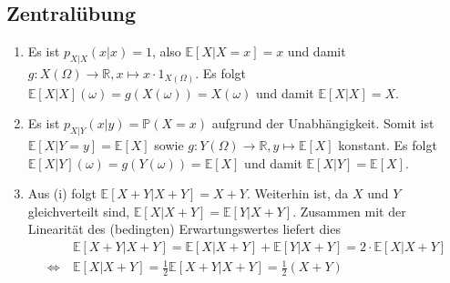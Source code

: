 \documentclass[a4paper]{article}
\begin{document}
\makeexheader

\subsection{Zentralübung}

\begin{enumerate}
    \item Es ist $p_{X|X}(x|x) = 1$, also $\mathds{E}[X|X=x] = x$ und damit $g: X(\Omega) \to \mathds{R}, x \mapsto x \cdot 1_{X(\Omega)}$. Es folgt $\mathds{E}[X|X](\omega) = g(X(\omega)) = X(\omega)$ und damit $\mathds{E}[X|X] = X$.
    \item Es ist $p_{X|Y}(x|y) = \mathds{P}(X = x)$ aufgrund der Unabhängigkeit. Somit ist $\mathds{E}[X|Y=y] = \mathds{E}[X]$ sowie $g: Y(\Omega) \to \mathds{R}, y \mapsto \mathds{E}[X]$ konstant. Es folgt $\mathds{E}[X|Y](\omega) = g(Y(\omega)) = \mathds{E}[X]$ und damit $\mathds{E}[X|Y] = \mathds{E}[X]$.
    \item Aus (i) folgt $\mathds{E}[X + Y | X + Y] = X + Y$. Weiterhin ist, da $X$ und $Y$ gleichverteilt sind, $\mathds{E}[X | X + Y] = \mathds{E}[Y | X + Y]$. Zusammen mit der Linearität des (bedingten) Erwartungswertes liefert dies
    \begin{align*}
        &\mathds{E}[X + Y | X + Y] = \mathds{E}[X| X + Y] + \mathds{E}[ Y | X + Y] = 2 \cdot \mathds{E}[X| X + Y] \\ \iff \ &\mathds{E}[X| X + Y] = \frac{1}{2} \mathds{E}[X + Y | X + Y] = \frac{1}{2} (X + Y)
    \end{align*}
\end{enumerate}

\subsection{}

\subsection{}
\end{document}
